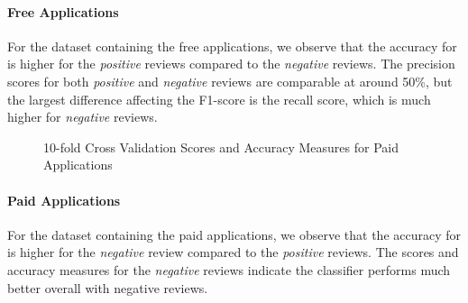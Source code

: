 \documentclass[11pt]{report} %
\begin{document}
\paragraph{Free Applications} For the dataset containing the free applications, we observe that the accuracy for is higher for the \textit{positive} reviews compared to the \textit{negative} reviews. The precision scores for both \textit{positive} and \textit{negative} reviews are comparable at around 50\%, but the largest difference affecting the F1-score is the recall score, which is much higher for \textit{negative} reviews.

\begin{figure}[h!]
\centering
{}
\caption[Optional caption for list of figures]{10-fold Cross Validation Scores and Accuracy Measures for Paid Applications }
\label{fig:subfigureExample}
\end{figure}

\paragraph{Paid Applications} For the dataset containing the paid applications, we observe that the accuracy for is higher for the \textit{negative} review compared to the \textit{positive} reviews. The scores and accuracy measures for the \textit{negative} reviews indicate the classifier performs much better overall with negative reviews.
\end{document}
